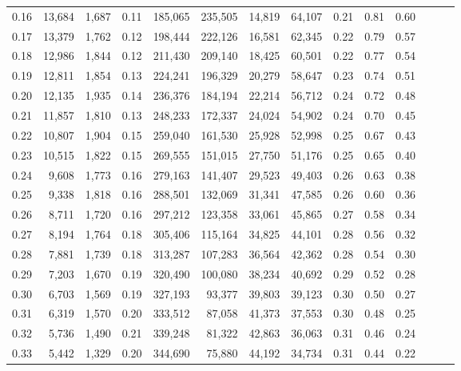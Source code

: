 \begin{tabular}{rrrrrrrrrrrrrr}
0.16 &  13,684 &  1,687 &  0.11 &  185,065 &  235,505 &  14,819 &  64,107 &  0.21 &  0.81 &      0.60 \\
0.17 &  13,379 &  1,762 &  0.12 &  198,444 &  222,126 &  16,581 &  62,345 &  0.22 &  0.79 &      0.57 \\
0.18 &  12,986 &  1,844 &  0.12 &  211,430 &  209,140 &  18,425 &  60,501 &  0.22 &  0.77 &      0.54 \\
0.19 &  12,811 &  1,854 &  0.13 &  224,241 &  196,329 &  20,279 &  58,647 &  0.23 &  0.74 &      0.51 \\
0.20 &  12,135 &  1,935 &  0.14 &  236,376 &  184,194 &  22,214 &  56,712 &  0.24 &  0.72 &      0.48 \\
0.21 &  11,857 &  1,810 &  0.13 &  248,233 &  172,337 &  24,024 &  54,902 &  0.24 &  0.70 &      0.45 \\
0.22 &  10,807 &  1,904 &  0.15 &  259,040 &  161,530 &  25,928 &  52,998 &  0.25 &  0.67 &      0.43 \\
0.23 &  10,515 &  1,822 &  0.15 &  269,555 &  151,015 &  27,750 &  51,176 &  0.25 &  0.65 &      0.40 \\
0.24 &   9,608 &  1,773 &  0.16 &  279,163 &  141,407 &  29,523 &  49,403 &  0.26 &  0.63 &      0.38 \\
0.25 &   9,338 &  1,818 &  0.16 &  288,501 &  132,069 &  31,341 &  47,585 &  0.26 &  0.60 &      0.36 \\
0.26 &   8,711 &  1,720 &  0.16 &  297,212 &  123,358 &  33,061 &  45,865 &  0.27 &  0.58 &      0.34 \\
0.27 &   8,194 &  1,764 &  0.18 &  305,406 &  115,164 &  34,825 &  44,101 &  0.28 &  0.56 &      0.32 \\
0.28 &   7,881 &  1,739 &  0.18 &  313,287 &  107,283 &  36,564 &  42,362 &  0.28 &  0.54 &      0.30 \\
0.29 &   7,203 &  1,670 &  0.19 &  320,490 &  100,080 &  38,234 &  40,692 &  0.29 &  0.52 &      0.28 \\
0.30 &   6,703 &  1,569 &  0.19 &  327,193 &   93,377 &  39,803 &  39,123 &  0.30 &  0.50 &      0.27 \\
0.31 &   6,319 &  1,570 &  0.20 &  333,512 &   87,058 &  41,373 &  37,553 &  0.30 &  0.48 &      0.25 \\
0.32 &   5,736 &  1,490 &  0.21 &  339,248 &   81,322 &  42,863 &  36,063 &  0.31 &  0.46 &      0.24 \\
0.33 &   5,442 &  1,329 &  0.20 &  344,690 &   75,880 &  44,192 &  34,734 &  0.31 &  0.44 &      0.22 \\

\end{tabular}
